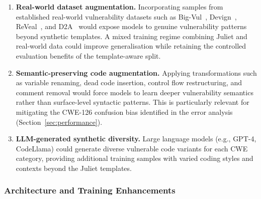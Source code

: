 \documentclass[conference]{IEEEtran}
\begin{document}
\begin{enumerate}
    \item \textbf{Real-world dataset augmentation.}
          Incorporating samples from established real-world vulnerability
          datasets such as Big-Vul~\cite{fan2020bigvul},
          Devign~\cite{zhou2019devign}, ReVeal~\cite{chakraborty2021reveal},
          and D2A~\cite{zheng2021d2a} would expose models to genuine
          vulnerability patterns beyond synthetic templates.  A mixed
          training regime combining Juliet and real-world data could
          improve generalisation while retaining the controlled evaluation
          benefits of the template-aware split.

    \item \textbf{Semantic-preserving code augmentation.}
          Applying transformations such as variable renaming, dead code
          insertion, control flow restructuring, and comment
          removal would force models to learn deeper vulnerability
          semantics rather than surface-level syntactic patterns.  This
          is particularly relevant for mitigating the CWE-126 confusion
          bias identified in the error analysis
          (Section~\ref{sec:performance}).

    \item \textbf{LLM-generated synthetic diversity.}
          Large language models (e.g., GPT-4, CodeLlama) could generate
          diverse vulnerable code variants for each CWE category, providing
          additional training samples with varied coding styles and contexts
          beyond the Juliet templates.
\end{enumerate}

\subsubsection{Architecture and Training Enhancements}
\end{document}
